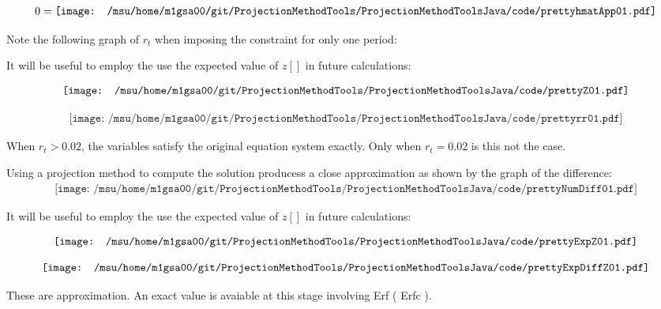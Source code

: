 \documentclass[12pt]{article}
\begin{document}
\begin{gather*}
  0=\vcenter{\hbox{\texttt{[image: /msu/home/m1gsa00/git/ProjectionMethodTools/ProjectionMethodToolsJava/code/prettyhmatApp01.pdf]}}}
\end{gather*}

Note the following graph of $r_t$ when imposing the constraint for only one period:




It will be useful to employ the use the expected value of $z[]$ in future calculations:


\begin{gather*}
  \vcenter{\hbox{\texttt{[image: /msu/home/m1gsa00/git/ProjectionMethodTools/ProjectionMethodToolsJava/code/prettyZ01.pdf]}}}\\
\end{gather*}




\begin{gather*}
\texttt{[image: /msu/home/m1gsa00/git/ProjectionMethodTools/ProjectionMethodToolsJava/code/prettyrr01.pdf]}
\end{gather*}

When $r_t>0.02$, the variables satisfy the original equation system exactly.
Only when $r_t=0.02$ is this not the case.

Using a projection method to compute the solution producess a close approximation as shown by the graph of the difference:
\begin{gather*}
\texttt{[image: /msu/home/m1gsa00/git/ProjectionMethodTools/ProjectionMethodToolsJava/code/prettyNumDiff01.pdf]}
\end{gather*}



It will be useful to employ the use the expected value of $z[]$ in future calculations:


\begin{gather*}
  \vcenter{\hbox{\texttt{[image: /msu/home/m1gsa00/git/ProjectionMethodTools/ProjectionMethodToolsJava/code/prettyExpZ01.pdf]}}}\\
\end{gather*}

\begin{gather*}
  \vcenter{\hbox{\texttt{[image: /msu/home/m1gsa00/git/ProjectionMethodTools/ProjectionMethodToolsJava/code/prettyExpDiffZ01.pdf]}}}\\
\end{gather*}

These are approximation. An exact value is avaiable at this stage involving 
Erf ( Erfc ).
\end{document}
